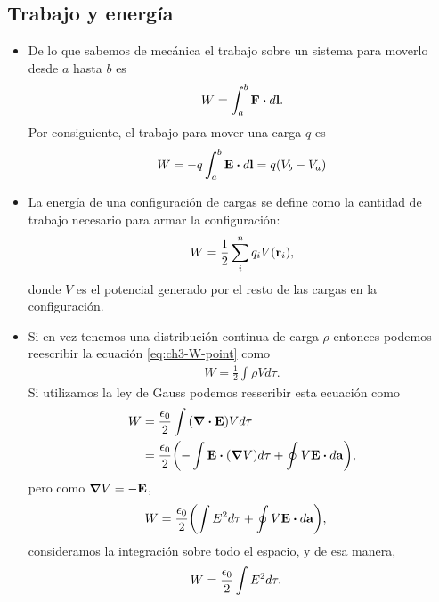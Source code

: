 \subsection{Trabajo y energía}
\begin{itemize}
\item De lo que sabemos de mecánica el trabajo sobre un sistema 
para moverlo desde $a$ hasta $b$ es 
\begin{align}
W=\int_a^b\vb{F}\vdot d\vb{l}.
\end{align}
Por consiguiente, el trabajo para mover una carga $q$ es
\begin{align}
W=-q\int_a^b\vb{E}\vdot d\vb{l}=q\qty(V_b-V_a)
\end{align}

\item La energía de una configuración de cargas se define 
como la cantidad de trabajo necesario para armar la configuración:
\begin{align}
W=\frac{1}{2}\sum_i^nq_iV(\vb{r}_i),
\label{eq:ch3-W-point}
\end{align}
donde $V$ es el potencial generado por el resto de las cargas 
en la configuración.

\item Si en vez tenemos una distribución continua de carga $\rho$
entonces podemos reescribir la ecuación \eqref{eq:ch3-W-point}
como
\begin{align}
W=\frac{1}{2} \int \rho Vd\tau.
\end{align}
Si utilizamos la ley de Gauss podemos resscribir esta ecuación como
\begin{align}
W&=\frac{\ep}{2} \int \qty(\div{\vb{E}}) Vd\tau\nonumber\\
&=\frac{\ep}{2}\qty(-\int \vb{E}\vdot \qty(\grad V)d\tau
+\oint V\vb{E}\vdot d\vb{a}),
\end{align}
pero como $\grad V=-\vb{E}$,
\begin{align}
W&=\frac{\ep}{2}\qty(\int E^2d\tau+\oint V\vb{E}\vdot d\vb{a}),
\end{align}
consideramos la integración sobre todo el espacio, y de esa manera,
\begin{align}
W&=\frac{\epsilon_0}{2}\int E^2d\tau.
\end{align}
\end{itemize}


